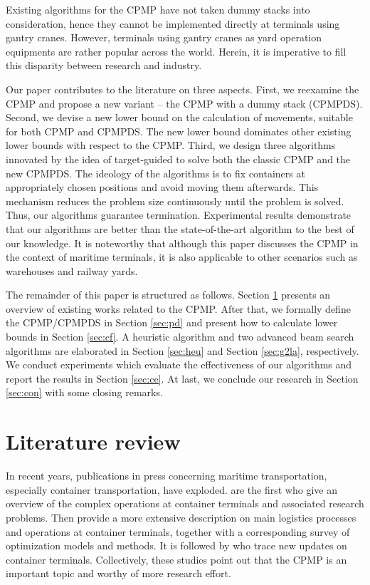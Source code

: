 \documentclass[review,3p,times,authoryear,12pt]{elsarticle}
\begin{document}
Existing algorithms for the CPMP have not taken dummy stacks into consideration, hence they cannot be implemented directly at terminals using gantry cranes. However, terminals using gantry cranes as yard operation equipments are rather popular across the world. Herein, it is imperative to fill this disparity between research and industry.

Our paper contributes to the literature on three aspects. First, we reexamine the CPMP and propose a new variant -- the CPMP with a dummy stack (CPMPDS). Second, we devise a new lower bound on the calculation of movements, suitable for both CPMP and CPMPDS. The new lower bound dominates other existing lower bounds with respect to the CPMP. Third, we design three algorithms innovated by the idea of target-guided to solve both the classic CPMP and the new CPMPDS. The ideology of the algorithms is to fix containers at appropriately chosen positions and avoid moving them afterwards. This mechanism reduces the problem size continuously until the problem is solved. Thus, our algorithms guarantee termination. Experimental results demonstrate that our algorithms are better than the state-of-the-art algorithm to the best of our knowledge. It is noteworthy that although this paper discusses the CPMP in the context of maritime terminals, it is also applicable to other scenarios such as warehouses and railway yards.

The remainder of this paper is structured as follows. Section \ref{sec:litreview} presents an overview of existing works related to the CPMP. After that, we formally define the CPMP/CPMPDS in Section \ref{sec:pd} and present how to calculate lower bounds in Section \ref{sec:cf}. A heuristic algorithm and two advanced beam search algorithms are elaborated in Section \ref{sec:heu} and Section \ref{sec:g2la}, respectively. We conduct experiments which evaluate the effectiveness of our algorithms and report the results in Section \ref{sec:ce}. At last, we conclude our research in Section \ref{sec:con} with some closing remarks.

\section{Literature review}
\label{sec:litreview}

In recent years, publications in press concerning maritime transportation, especially container transportation, have exploded. \cite{Vis2003} are the first who give an overview of the complex operations at container terminals and associated research problems.
Then \cite{Steenken2004} provide a more extensive description on main logistics processes and operations at container terminals, together with a corresponding survey of optimization models and methods. It is followed by \cite{Stahlbock2008} who trace new updates on container terminals.
Collectively, these studies point out that the CPMP is an important topic and worthy of more research effort.
\end{document}
